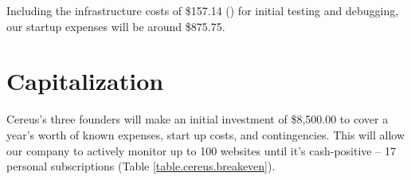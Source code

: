 \noindent
Including the infrastructure costs of \$157.14 () for initial testing and debugging, our startup expenses will be around \$875.75.

\section{Capitalization}

Cereus's three founders will make an initial investment of \$8,500.00 to cover a year's worth of known expenses, start up costs, and contingencies. This will allow our company to actively monitor up to 100 websites until it's cash-positive -- 17 personal subscriptions (Table \ref{table.cereus.breakeven}).

